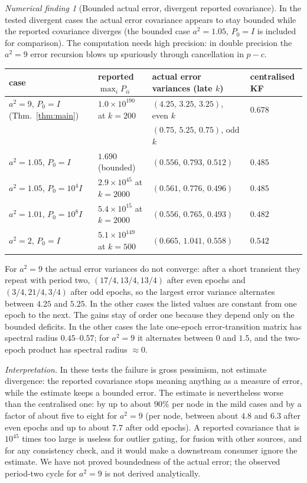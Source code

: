 \documentclass[11pt,a4paper]{article}
\numberwithin{equation}{section}
\theoremstyle{remark}\newtheorem{remark}[theorem]{Remark}
\newtheorem{finding}[theorem]{Numerical finding}
\begin{document}
\begin{finding}[Bounded actual error, divergent reported covariance]\label{find:error}
In the tested divergent cases the actual error covariance appears to stay bounded while the
reported covariance diverges (the bounded case $a^2=1.05$, $P_0=I$ is included for comparison). The
computation needs high precision: in double precision the $a^2=9$ error recursion blows up spuriously
through cancellation in $p-c$.

\begin{center}\small
\begin{tabular}{@{}llll@{}}
\toprule
case & reported $\max_iP_{ii}$ & actual error variances (late $k$) & centralised KF\\
\midrule
$a^2=9$, $P_0=I$ (Thm.~\ref{thm:main}) & $1.0\times10^{190}$ at $k=200$ & $(4.25,\,3.25,\,3.25)$, even $k$ & $0.678$\\
 & & $(0.75,\,5.25,\,0.75)$, odd $k$ & \\
$a^2=1.05$, $P_0=I$ & $1.690$ (bounded) & $(0.556,\,0.793,\,0.512)$ & $0.485$\\
$a^2=1.05$, $P_0=10^4I$ & $2.9\times10^{45}$ at $k=2000$ & $(0.561,\,0.776,\,0.496)$ & $0.485$\\
$a^2=1.01$, $P_0=10^8I$ & $5.4\times10^{15}$ at $k=2000$ & $(0.556,\,0.765,\,0.493)$ & $0.482$\\
$a^2=2$, $P_0=I$ & $5.1\times10^{149}$ at $k=500$ & $(0.665,\,1.041,\,0.558)$ & $0.542$\\
\bottomrule
\end{tabular}
\end{center}
For $a^2=9$ the actual error variances do not converge: after a short transient they repeat
with period two, $(17/4,13/4,13/4)$ after even epochs and $(3/4,21/4,3/4)$ after odd epochs, so the
largest error variance alternates between $4.25$ and $5.25$. In the other cases the listed values
are constant from one epoch to the next. The gains stay of order one because they depend only on
the bounded deficits. In the other cases the late one-epoch error-transition matrix has spectral
radius $0.45$--$0.57$; for $a^2=9$ it alternates between $0$ and $1.5$, and the two-epoch product
has spectral radius $\approx0$.
\end{finding}

\emph{Interpretation.} In these tests the failure is gross pessimism, not estimate divergence:
the reported covariance stops meaning anything as a measure of error, while the estimate keeps
a bounded error. The estimate is nevertheless worse than the centralised one: by up to about $90\%$ per node in
the mild cases and by a factor of about five to eight for $a^2=9$ (per node, between about $4.8$ and $6.3$
after even epochs and up to about $7.7$ after odd epochs). A reported covariance that is
$10^{45}$ times too large is useless for outlier gating, for fusion with other sources, and for
any consistency check, and it would make a downstream consumer ignore the estimate. We have not
proved boundedness of the actual error; the observed period-two cycle for $a^2=9$ is
not derived analytically.
\end{document}
